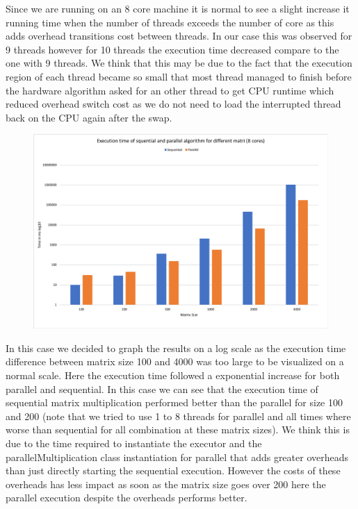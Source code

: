 \documentclass[11pt,letterpaper]{exam}
\begin{document}
\begin{questions}
			\quad Since we are running on an 8 core machine it is normal to see a slight increase it running time when the number of threads exceeds the number of core as this adds overhead transitions cost between threads. In our case this was observed for 9 threads however for 10 threads the execution time decreased compare to the one with 9 threads. We think that this may be due to the fact that the execution region of each thread became so small that most thread managed to finish before the hardware algorithm asked for an other thread to get CPU runtime which reduced overhead switch cost as we do not need to load the interrupted thread back on the CPU again after the swap.			
			\begin{figure}[h!]
				\centering
				\includegraphics[scale=0.5]{ExectionParallelSequential}
			\end{figure}
			In this case we decided to graph the results on a log scale as the execution time difference between matrix size 100 and 4000 was too large to be visualized on a normal scale. Here the execution time followed a exponential increase for both parallel and sequential. In this case we can see that the execution time of sequential matrix multiplication performed better than the parallel for size 100 and 200 (note that we tried to use 1 to 8 threads for parallel and all times where worse than sequential for all combination at these matrix sizes). We think this is due to the time required to instantiate the executor and the parallelMultiplication class instantiation for parallel that adds greater overheads than just directly starting the sequential execution. However the costs of these overheads has less impact as soon as the matrix size goes over 200 here the parallel execution despite the overheads performs better.

\end{questions}
\end{document}
